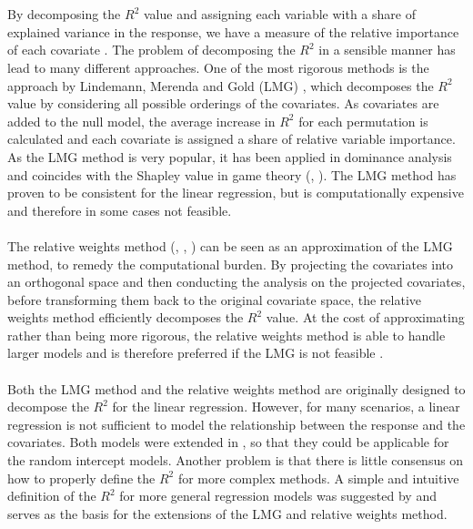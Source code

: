 \\
\\
By decomposing the $R^2$ value and assigning each variable with a share of explained variance in the response, we have a measure of the relative importance of each covariate \citep{gromping_relaimpo}. The problem of decomposing the $R^2$ in a sensible manner has lead to many different approaches. One of the most rigorous methods is the approach by Lindemann, Merenda and Gold (LMG) \citep{Lindeman1980}, which decomposes the $R^2$ value by considering all possible orderings of the covariates. As covariates are added to the null model, the average increase in $R^2$ for each permutation is calculated and each covariate is assigned a share of relative variable importance. As the LMG method is very popular, it has been applied in dominance analysis \citep{budescu1993dominance} and coincides with the Shapley value in game theory (\citet{Shapley1953StochasticG}, \citet{Lipovetsky_GameTheory}). The LMG method has proven to be consistent for the linear regression, but is computationally expensive and therefore in some cases not feasible. 
\\
\\
The relative weights method (\citet{johnson_minimization_trace}, \citet{Fabbris1980}, \citet{Genizi_relative_weights}) can be seen as an approximation of the LMG method, to remedy the computational burden. By projecting the covariates into an orthogonal space and then conducting the analysis on the projected covariates, before transforming them back to the original covariate space, the relative weights method efficiently decomposes the $R^2$ value. At the cost of approximating rather than being more rigorous, the relative weights method is able to handle larger models and is therefore preferred if the LMG is not feasible \citep{gromping_relaimpo}.
\\
\\ 
Both the LMG method and the relative weights method are originally designed to decompose the $R^2$ for the linear regression. However, for many scenarios, a linear regression is not sufficient to model the relationship between the response and the covariates. Both models were extended in \citet{matre}, so that they could be applicable for the random intercept models. Another problem is that there is little consensus on how to properly define the $R^2$ for more complex methods. A simple and intuitive definition of the $R^2$ for more general regression models was suggested by \citet{nakagawa2013general} and serves as the basis for the extensions of the LMG and relative weights method. 
